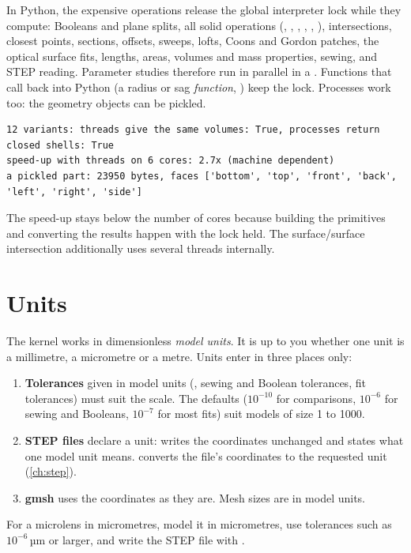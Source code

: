 In Python, the expensive operations release the global interpreter lock while they compute:
Booleans and plane splits, all solid operations (, , ,
, , ), intersections, closest points,
sections, offsets, sweeps, lofts, Coons and Gordon patches, the optical surface fits, lengths,
areas, volumes and mass properties, sewing,  and STEP reading. Parameter studies
therefore run in parallel in a . Functions that call
back into Python (a radius or sag \emph{function}, ) keep the lock. Processes
work too: the geometry objects can be pickled.


\begin{lstlisting}[style=text]
12 variants: threads give the same volumes: True, processes return closed shells: True
speed-up with threads on 6 cores: 2.7x (machine dependent)
a pickled part: 23950 bytes, faces ['bottom', 'top', 'front', 'back', 'left', 'right', 'side']
\end{lstlisting}

The speed-up stays below the number of cores because building the primitives and converting
the results happen with the lock held. The surface/surface intersection additionally uses
several threads internally.

\section{Units}\label{sec:concepts-units}

The kernel works in dimensionless \emph{model units}. It is up to you whether one unit is a
millimetre, a micrometre or a metre. Units enter in three places only:

\begin{enumerate}
  \item \textbf{Tolerances} given in model units (, sewing and Boolean tolerances,
    fit tolerances) must suit the scale. The defaults ($10^{-10}$ for comparisons, $10^{-6}$ for
    sewing and Booleans, $10^{-7}$ for most fits) suit models of size 1 to 1000.
  \item \textbf{STEP files} declare a unit:  writes the
    coordinates unchanged and states what one model unit means.  converts the file's coordinates to the requested unit (\cref{ch:step}).
  \item \textbf{gmsh} uses the coordinates as they are. Mesh sizes are in model units.
\end{enumerate}

For a microlens in micrometres, model it in micrometres, use tolerances such as $10^{-6}$\,µm
or larger, and write the STEP file with .
